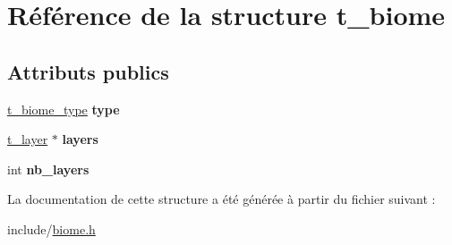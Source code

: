 \hypertarget{structt__biome}{}\section{Référence de la structure t\+\_\+biome}
\label{structt__biome}
\subsection*{Attributs publics}
\begin{DoxyCompactItemize}
\item 
\mbox{\label{structt__biome_a5f98728ce6d136f82967e973d0716563}} 
\hyperlink{biome_8h_a88cfbc9884749042980d5910ea44e231}{t\+\_\+biome\+\_\+type} {\bfseries type}
\item 
\mbox{\label{structt__biome_af439da3993b08a875702712cee8ba462}} 
\hyperlink{structt__layer}{t\+\_\+layer} $\ast$ {\bfseries layers}
\item 
\mbox{\label{structt__biome_a24c16429cdefda2014c96a0470716953}} 
int {\bfseries nb\+\_\+layers}
\end{DoxyCompactItemize}


La documentation de cette structure a été générée à partir du fichier suivant \+:\begin{DoxyCompactItemize}
\item 
include/\hyperlink{biome_8h}{biome.\+h}\end{DoxyCompactItemize}
